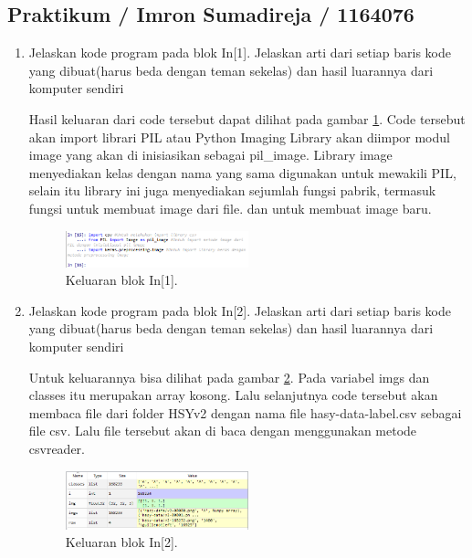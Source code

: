 \subsection{Praktikum / Imron Sumadireja / 1164076}
\begin{enumerate}
\item Jelaskan kode program pada blok In[1]. Jelaskan arti dari setiap baris kode yang dibuat(harus beda dengan teman sekelas) dan hasil luarannya dari komputer sendiri \par

Hasil keluaran dari code tersebut dapat dilihat pada gambar \ref{math1}. Code tersebut akan import librari PIL atau Python Imaging Library akan diimpor modul image yang akan di inisiasikan sebagai pil\_image. Library image menyediakan kelas dengan nama yang sama digunakan untuk mewakili PIL, selain itu library ini juga menyediakan sejumlah fungsi pabrik, termasuk fungsi untuk membuat image dari file. dan untuk membuat image baru.
		\begin{figure}[!htbp]
		\centerline{\includegraphics[width=0.5\textwidth]{figures/im/math1.png}}
		\caption{Keluaran blok In[1].}
		\label{math1}
		\end{figure}

\item Jelaskan kode program pada blok In[2]. Jelaskan arti dari setiap baris kode yang dibuat(harus beda dengan teman sekelas) dan hasil luarannya dari komputer sendiri \par

Untuk keluarannya bisa dilihat pada gambar \ref{math2}. Pada variabel imgs dan classes itu merupakan array kosong. Lalu selanjutnya code tersebut akan membaca file dari folder HSYv2 dengan nama file hasy-data-label.csv sebagai file csv. Lalu file tersebut akan di baca dengan menggunakan metode csvreader.
		\begin{figure}[!htbp]
		\centerline{\includegraphics[width=0.5\textwidth]{figures/im/math2.png}}
		\caption{Keluaran blok In[2].}
		\label{math2}
		\end{figure}


\end{enumerate}
